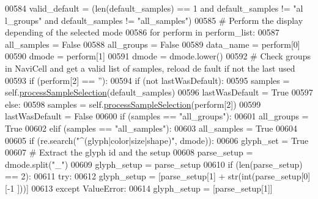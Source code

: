 \begin{DoxyCode}
00584             valid\_default = (len(default\_samples) == 1 \textcolor{keywordflow}{and} default\_samples != \textcolor{stringliteral}{"al
      l\_groups"} \textcolor{keywordflow}{and} default\_samples != \textcolor{stringliteral}{"all\_samples"})
00585         \textcolor{comment}{# Perform the display depending of the selected mode}
00586         \textcolor{keywordflow}{for} perform \textcolor{keywordflow}{in} perform\_list:
00587             all\_samples = \textcolor{keyword}{False}
00588             all\_groups = \textcolor{keyword}{False}
00589             data\_name = perform[0]
00590             dmode = perform[1]
00591             dmode = dmode.lower()
00592             \textcolor{comment}{# Check groups in NaviCell and get a valid list of samples, reload de
      fault if not the last used}
00593             \textcolor{keywordflow}{if} (perform[2] == \textcolor{stringliteral}{''}):
00594                 \textcolor{keywordflow}{if} (\textcolor{keywordflow}{not} lastWasDefault):
00595                     samples = self.\hyperlink{classnavicom_1_1navicom_1_1NaviCom_a6536cf86235df90cb7443c23f11870e4}{processSampleSelection}(default\_samples)
00596                     lastWasDefault = \textcolor{keyword}{True}
00597             \textcolor{keywordflow}{else}:
00598                 samples = self.\hyperlink{classnavicom_1_1navicom_1_1NaviCom_a6536cf86235df90cb7443c23f11870e4}{processSampleSelection}(perform[2])
00599                 lastWasDefault = \textcolor{keyword}{False}
00600             \textcolor{keywordflow}{if} (samples == \textcolor{stringliteral}{"all\_groups"}):
00601                 all\_groups = \textcolor{keyword}{True}
00602             \textcolor{keywordflow}{elif} (samples == \textcolor{stringliteral}{"all\_samples"}):
00603                 all\_samples = \textcolor{keyword}{True}
00604 
00605             \textcolor{keywordflow}{if} (re.search(\textcolor{stringliteral}{"^(glyph|color|size|shape)"}, dmode)):
00606                 glyph\_set = \textcolor{keyword}{True}
00607                 \textcolor{comment}{# Extract the glyph id and the setup}
00608                 parse\_setup = dmode.split(\textcolor{stringliteral}{"\_"})
00609                 glyph\_setup = parse\_setup
00610                 \textcolor{keywordflow}{if} (len(parse\_setup) == 2):
00611                     \textcolor{keywordflow}{try}:
00612                         glyph\_setup = [parse\_setup[1] + str(int(parse\_setup[0][-1
      ]))]
00613                     \textcolor{keywordflow}{except} ValueError:
00614                         glyph\_setup = [parse\_setup[1]]

\end{DoxyCode}
